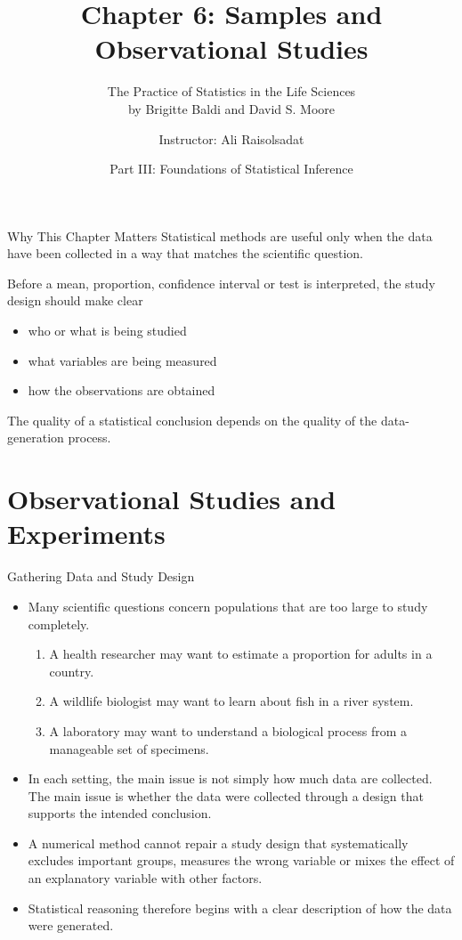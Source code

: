 \documentclass[aspectratio=169]{beamer}
\title[Chapter 6: Samples and Observational Studies]{\textbf{Chapter 6: Samples and Observational Studies}}
\subtitle{The Practice of Statistics in the Life Sciences \\ by Brigitte Baldi and David S. Moore}
\author{Instructor: Ali Raisolsadat}
\date{Part III: Foundations of Statistical Inference}
\begin{document}
\begin{frame}
  \titlepage
\end{frame}

\begin{frame}{Why This Chapter Matters}
Statistical methods are useful only when the data have been collected in a way that matches the scientific question.

\vspace{0.15cm}
Before a mean, proportion, confidence interval or test is interpreted, the study design should make clear
\begin{itemize}
  \item who or what is being studied
  \item what variables are being measured
  \item how the observations are obtained
\end{itemize}

The quality of a statistical conclusion depends on the quality of the data-generation process.
\end{frame}

\section{Observational Studies and Experiments}

\begin{frame}{Gathering Data and Study Design}
\begin{itemize}
	\item Many scientific questions concern populations that are too large to study completely.
	\begin{enumerate}
		\item A health researcher may want to estimate a proportion for adults in a country.
		\item A wildlife biologist may want to learn about fish in a river system. 
		\item A laboratory may want to understand a biological process from a manageable set of specimens.
	\end{enumerate}
	\item In each setting, the main issue is not simply how much data are collected. The main issue is whether the data were collected through a design that supports the intended conclusion.
	\item A numerical method cannot repair a study design that systematically excludes important groups, measures the wrong variable or mixes the effect of an explanatory variable with other factors.
	\item Statistical reasoning therefore begins with a clear description of how the data were generated.
\end{itemize}
\end{frame}
\end{document}
